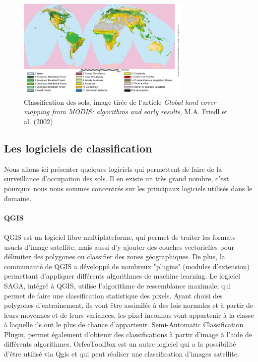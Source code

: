 \documentclass[a4paper,10pt]{article}
\begin{document}
\begin{figure}[H]
  \centering
    \includegraphics[width=0.75\textwidth]{classifSols.png}
  \caption{Classification des sols, image tirée de l'article \textit{Global land cover mapping from MODIS: algorithms and early results}, M.A. Friedl et al. (2002)}
  \label{fig:clSols}
\end{figure}

\subsection{Les logiciels de classification}
Nous allons ici présenter quelques logiciels qui permettent de faire de la surveillance d'occupation des sols. Il en existe un très grand nombre, c'est pourquoi nous nous sommes concentrés sur les principaux logiciels utilisés dans le domaine.
\paragraph{QGIS}
\paragraph{}
QGIS est un logiciel libre multiplateforme, qui permet de traiter les formats usuels d'image satellite, mais aussi d'y ajouter des couches vectorielles pour délimiter des polygones ou classifier des zones géographiques.
De plus, la communauté de QGIS a développé de nombreux "plugins" (modules d'extension) permettant d'appliquer différents algorithmes de machine learning.\newline
Le logiciel SAGA, intégré à QGIS, utilise l'algorithme de ressemblance maximale, qui permet de faire une classification statistique des pixels. Ayant choisi des polygones d'entraînement, ils vont être assimilés à des lois normales et à partir de leurs moyennes et de leurs variances, les pixel inconnus vont appartenir à la classe à laquelle ils ont le plus de chance d'appartenir.
Semi-Automatic Classification Plugin, permet également d'obtenir des classifications à partir d'image à l'aide de différents algorithmes.
OrfeoToolBox est un autre logiciel qui a la possibilité d'être utilisé via Qgis et qui peut réaliser une classification d'images satellite.
\end{document}
